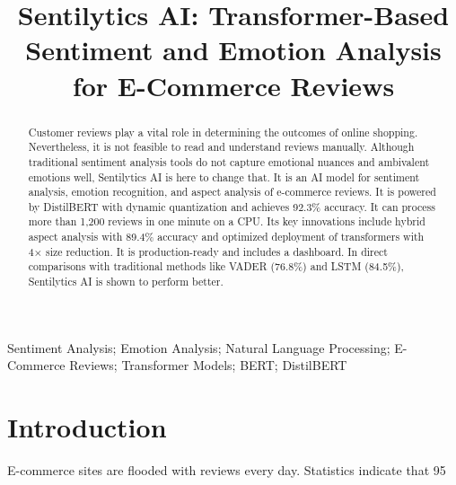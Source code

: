 \documentclass[]{interact}
\theoremstyle{plain}
\theoremstyle{definition}
\theoremstyle{remark}
\begin{document}

\title{Sentilytics AI: Transformer-Based Sentiment and Emotion Analysis for E-Commerce Reviews}

\author{
}

\maketitle

\begin{abstract}
Customer reviews play a vital role in determining the outcomes of online shopping. Nevertheless, it is not feasible to read and understand reviews manually. Although traditional sentiment analysis tools do not capture emotional nuances and ambivalent emotions well, Sentilytics AI is here to change that. It is an AI model for sentiment analysis, emotion recognition, and aspect analysis of e-commerce reviews. It is powered by DistilBERT with dynamic quantization and achieves 92.3\% accuracy. It can process more than 1,200 reviews in one minute on a CPU. Its key innovations include hybrid aspect analysis with 89.4\% accuracy and optimized deployment of transformers with 4× size reduction. It is production-ready and includes a dashboard. In direct comparisons with traditional methods like VADER (76.8\%) and LSTM (84.5\%), Sentilytics AI is shown to perform better.
\end{abstract}

\begin{keywords}
Sentiment Analysis; Emotion Analysis; Natural Language Processing; E-Commerce Reviews; Transformer Models; BERT; DistilBERT
\end{keywords}


\section{Introduction}

E-commerce sites are flooded with reviews every day. Statistics indicate that 95%
\end{document}

